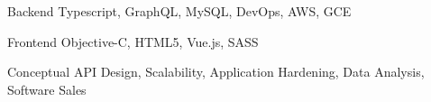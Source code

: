 

\begin{cvskills}

  \cvskill
    {Backend} %
    {Typescript, GraphQL, MySQL, DevOps, AWS, GCE} %

  \cvskill
    {Frontend} %
    {Objective-C, HTML5, Vue.js, SASS} %
    
  \cvskill
    {Conceptual} %
    {API Design, Scalability, Application Hardening, Data Analysis, Software Sales} %

\end{cvskills}
